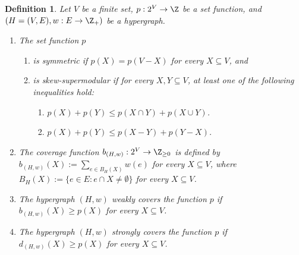 \documentclass{article}
\newtheorem{definition}{Definition}[section]
\newcommand{\shubhang}[1]{{\color{blue}[{\tiny Shubhang: \bf #1}]\marginpar{\color{blue}*}}}
\newcommand{\knote}[1]{{\color{red}[{\tiny Karthik: \bf #1}]\marginpar{\color{red}*}}}
\newcommand{\kristof}[1]{{\color{purple}[{\tiny Kristof: \bf #1}]\marginpar{\color{red}*}}}
\begin{document}
\begin{definition}
    Let $V$ be a finite set, $p: 2^V\rightarrow \Z$ be a set function,  and $(H=(V, E), w:E\rightarrow \Z_+)$ be a hypergraph. 
\begin{enumerate}
    \item The set function $p$
    \begin{enumerate}
    \item is \emph{symmetric} if $p(X)=p(V-X)$ for every $X\subseteq V$, and 
    \item is \emph{skew-supermodular} if for every $X, Y\subseteq V$, at least one of the following inequalities hold: 
    \begin{enumerate}
    \item $p(X) + p(Y) \leq p(X\cap Y) + p(X\cup Y)$. %
    \item $p(X) + p(Y) \leq p(X - Y) + p(Y - X)$. %
\end{enumerate}
\end{enumerate}
    \item The coverage function $b_{(H, w)}:2^V\rightarrow \Z_{\ge 0}$ is defined by $b_{(H,w)}(X):=\sum_{e\in B_H(X)}w(e)$ for every $X\subseteq V$, where $B_H(X):=\{e\in E: e\cap X\neq \emptyset\}$ for every $X\subseteq V$. 
    \item The hypergraph $(H, w)$ \emph{weakly covers} the function $p$ if $b_{(H, w)}(X)\ge p(X)$ for every $X\subseteq V$. 
    \item The hypergraph $(H, w)$ \emph{strongly covers} the function $p$ if $d_{(H, w)}(X)\ge p(X)$ for every $X\subseteq V$. 
\end{enumerate}
\end{definition}
\end{document}
